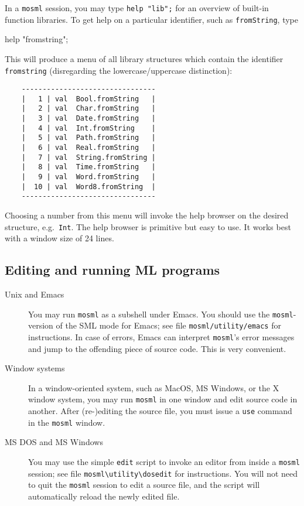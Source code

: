 \documentclass[fleqn,a4paper]{article}
\begin{document}
In a {\tt mosml} session, you may type {\tt help "lib";} for an
overview of built-in function libraries.  To get help on a particular
identifier, such as {\tt fromString}, type

\begin{program}
help "fromstring";
\end{program}

\noindent This will produce a menu of all library structures which
contain the identifier {\tt fromstring} (disregarding the
lowercase/uppercase distinction):

{\small\begin{verbatim}
    --------------------------------
    |   1 | val  Bool.fromString   |
    |   2 | val  Char.fromString   |
    |   3 | val  Date.fromString   |
    |   4 | val  Int.fromString    |
    |   5 | val  Path.fromString   |
    |   6 | val  Real.fromString   |
    |   7 | val  String.fromString |
    |   8 | val  Time.fromString   |
    |   9 | val  Word.fromString   |
    |  10 | val  Word8.fromString  |
    --------------------------------
\end{verbatim}}

\noindent Choosing a number from this menu will invoke the help
browser on the desired structure, e.g.\ {\tt Int}.  The help browser
is primitive but easy to use.  It works best with a window size of 24
lines.


\subsection{Editing and running ML programs}
\label{sec-editing}
\begin{description}
\item[Unix and Emacs] You may run {\tt mosml} as a subshell under
  Emacs.  You should use the {\tt mosml}-version of the SML mode for
  Emacs; see file {\tt mosml/utility/emacs} for instructions.  In case
  of errors, Emacs can interpret {\tt mosml}'s error messages and jump
  to the offending piece of source code.  This is very convenient.

\item[Window systems] In a window-oriented system, such as MacOS, MS
  Windows, or the X window system, you may run {\tt mosml} in one
  window and edit source code in another.  After (re-)editing the
  source file, you must issue a {\tt use} command in the {\tt mosml}
  window.
  
\item[MS DOS and MS Windows] You may use the simple {\tt edit} script
  to invoke an editor from inside a {\tt mosml} session; see file
  \verb#mosml\utility\dosedit# for instructions.  You will not need to
  quit the {\tt mosml} session to edit a source file, and the script
  will automatically reload the newly edited file.
\end{description}
\end{document}
